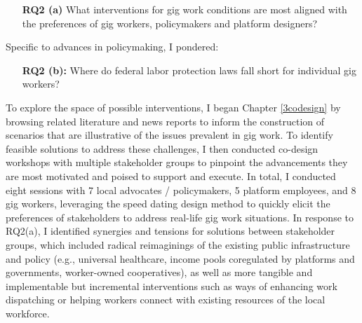 \begin{enumerate}
    \item[\textbf{RQ2 (a)}] What interventions for gig work conditions are most aligned with the preferences of gig workers, policymakers and platform designers? \cite{codesign}
\end{enumerate}

Specific to advances in policymaking, I pondered:

\begin{enumerate}
    \item[\textbf{RQ2 (b):}] Where do federal labor protection laws fall short for individual gig workers? \cite{individualized}
\end{enumerate}

To explore the space of possible interventions, I began Chapter \ref{3codesign} by browsing related literature and news reports to inform the construction of scenarios that are illustrative of the issues prevalent in gig work. To identify feasible solutions to address these challenges, I then conducted co-design workshops with multiple stakeholder groups to pinpoint the advancements they are most motivated and poised to support and execute. In total, I conducted eight sessions with 7 local advocates / policymakers, 5 platform employees, and 8 gig workers, leveraging the speed dating design method to quickly elicit the preferences of stakeholders to address real-life gig work situations. 
In response to RQ2(a), I identified synergies and tensions for solutions between stakeholder groups, which included radical reimaginings of the existing public infrastructure and policy (e.g., universal healthcare, income pools coregulated by platforms and governments, worker-owned cooperatives), as well as more tangible and implementable but incremental interventions such as ways of enhancing work dispatching or helping workers connect with existing resources of the local workforce.

